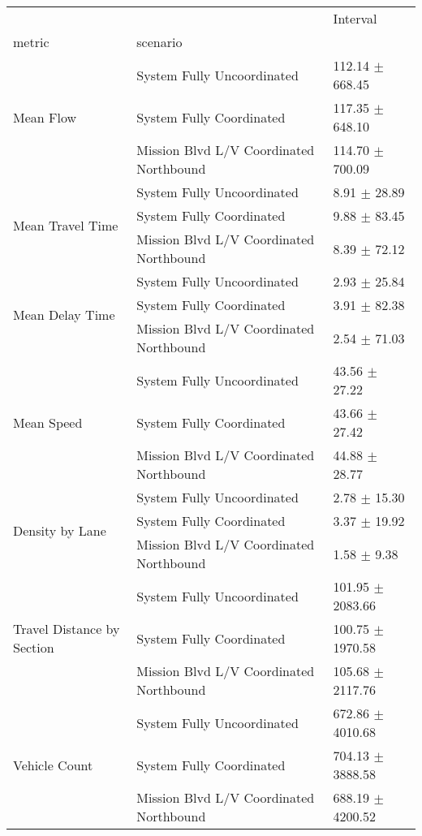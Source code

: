 \begin{tabular}{lll}
\toprule
 &  & Interval \\
metric & scenario &  \\
\midrule
\multirow[t]{3}{*}{Mean Flow} & System Fully Uncoordinated & 112.14 $\pm$ 668.45 \\
 & System Fully Coordinated & 117.35 $\pm$ 648.10 \\
 & Mission Blvd L/V Coordinated Northbound & 114.70 $\pm$ 700.09 \\
\multirow[t]{3}{*}{Mean Travel Time} & System Fully Uncoordinated & 8.91 $\pm$ 28.89 \\
 & System Fully Coordinated & 9.88 $\pm$ 83.45 \\
 & Mission Blvd L/V Coordinated Northbound & 8.39 $\pm$ 72.12 \\
\multirow[t]{3}{*}{Mean Delay Time} & System Fully Uncoordinated & 2.93 $\pm$ 25.84 \\
 & System Fully Coordinated & 3.91 $\pm$ 82.38 \\
 & Mission Blvd L/V Coordinated Northbound & 2.54 $\pm$ 71.03 \\
\multirow[t]{3}{*}{Mean Speed} & System Fully Uncoordinated & 43.56 $\pm$ 27.22 \\
 & System Fully Coordinated & 43.66 $\pm$ 27.42 \\
 & Mission Blvd L/V Coordinated Northbound & 44.88 $\pm$ 28.77 \\
\multirow[t]{3}{*}{Density by Lane} & System Fully Uncoordinated & 2.78 $\pm$ 15.30 \\
 & System Fully Coordinated & 3.37 $\pm$ 19.92 \\
 & Mission Blvd L/V Coordinated Northbound & 1.58 $\pm$ 9.38 \\
\multirow[t]{3}{*}{Travel Distance by Section} & System Fully Uncoordinated & 101.95 $\pm$ 2083.66 \\
 & System Fully Coordinated & 100.75 $\pm$ 1970.58 \\
 & Mission Blvd L/V Coordinated Northbound & 105.68 $\pm$ 2117.76 \\
\multirow[t]{3}{*}{Vehicle Count} & System Fully Uncoordinated & 672.86 $\pm$ 4010.68 \\
 & System Fully Coordinated & 704.13 $\pm$ 3888.58 \\
 & Mission Blvd L/V Coordinated Northbound & 688.19 $\pm$ 4200.52 \\
\bottomrule
\end{tabular}
